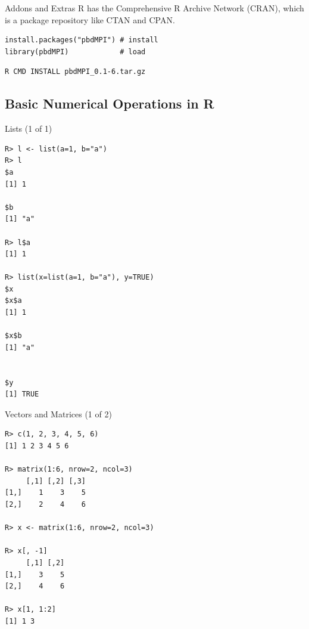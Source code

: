 \begin{frame}[fragile]
  \begin{block}{Addons and Extras}\pause
  R has the Comprehensive R Archive Network (CRAN), which is a package repository like CTAN and CPAN.
  \begin{lstlisting}[title=From R]
install.packages("pbdMPI") # install
library(pbdMPI)            # load
\end{lstlisting}

\begin{lstlisting}[title=From 	Shell,backgroundcolor=\color{white},basicstyle=\ttfamily\color{black}\scriptsize,keywordstyle=\color{black}, 
  commentstyle=\color{black},stringstyle=\color{black}]
R CMD INSTALL pbdMPI_0.1-6.tar.gz
\end{lstlisting}
\end{block}
\end{frame}






\subsection{Basic Numerical Operations in R}

\begin{frame}
  \begin{exampleblock}{Lists (1 of 1)}\pause
  \begin{lstlisting}[backgroundcolor=\color{white},basicstyle=\ttfamily\color{dkgray}\scriptsize,keywordstyle=\color{black}, 
  commentstyle=\color{orange},stringstyle=\color{mauve}]
R> l <- list(a=1, b="a")
R> l
$a
[1] 1

$b
[1] "a"

R> l$a
[1] 1

R> list(x=list(a=1, b="a"), y=TRUE)
$x
$x$a
[1] 1

$x$b
[1] "a"


$y
[1] TRUE
\end{lstlisting}
  \end{exampleblock}
\end{frame}



\begin{frame}
  \begin{exampleblock}{Vectors and Matrices (1 of 2)}\pause
  \begin{lstlisting}[backgroundcolor=\color{white},basicstyle=\ttfamily\color{dkgray}\scriptsize,keywordstyle=\color{black}, 
  commentstyle=\color{orange},stringstyle=\color{mauve}]
R> c(1, 2, 3, 4, 5, 6)
[1] 1 2 3 4 5 6

R> matrix(1:6, nrow=2, ncol=3)
     [,1] [,2] [,3]
[1,]    1    3    5
[2,]    2    4    6

R> x <- matrix(1:6, nrow=2, ncol=3)

R> x[, -1]
     [,1] [,2]
[1,]    3    5
[2,]    4    6

R> x[1, 1:2]
[1] 1 3
\end{lstlisting}
  \end{exampleblock}
\end{frame}



